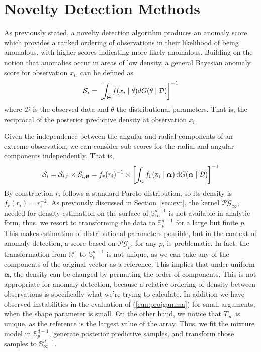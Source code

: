 \section{Novelty Detection Methods\label{sec:novelty}}
As previously stated, a novelty detection algorithm produces an anomaly score 
    which provides a ranked ordering of observations in their likelihood of being
    anomalous, with higher scores indicating more likely anomalous. Building on 
    the notion that anomalies occur in areas of low density, a general Bayesian
    anomaly score for observation $x_i$, can be defined as
    \[
    \mathcal{S}_i = \left[\int_{\Theta}f(x_i\mid\theta)dG(\theta\mid\mathcal{D})\right]^{-1}
    \]
    where $\mathcal{D}$ is the observed data and $\theta$ the distributional
    parameters.  That is, the reciprocal of the posterior predictive density 
    at observation $x_i$.

Given the independence between the angular and radial components of an
    extreme observation, we can consider sub-scores for the radial 
    and angular components independently.  That is,
    \[
        \mathcal{S}_i = \mathcal{S}_{i,r}\times \mathcal{S}_{i,\bm{v}} = 
            f_r(r_i)^{-1}\times
            \left[\int_{\Omega} f_v(\bm{v}_i\mid\bm{\alpha})
                \,\text{d}G(\bm{\alpha}\mid\mathcal{D})\right]^{-1}
    \]
    By construction $r_i$ follows a standard Pareto distribution, so its
    density is $f_r(r_i) = r_i^{-2}$.  As previously discussed in
    Section~\ref{sec:evt}, the kernel $\mathcal{PG}_\infty$, needed for 
    density estimation on the surface of ${\mathbb S}_{\infty}^{d-1}$ is 
    not available in analytic form, thus, we resort to transforming the
    data to $\mathbb{S}_p^{d-1}$ for a large but finite $p$.
    This makes estimation of distributional parameters possible, 
    but in the context of anomaly detection, a score based on
    $\mathcal{PG}_p$, for any $p$, is problematic.  In fact, the 
    transformation from ${\mathbb R}_+^p$ to $\mathbb{S}_p^{d-1}$ is not
    unique, as we can take any of the components of the original vector
    as a reference.  This implies that
    under uniform $\bm{\alpha}$, the density can be changed by
    permuting the order of components.  This is not appropriate for anomaly
    detection, because a relative ordering of density between 
    observations is specifically what we're trying to calculate. In addition
    we have observed instabilities in the evaluation of (\ref{eqn:projgamma}) 
    for small arguments, when the shape parameter is small. On the other hand,
    we notice that $T_\infty$ is unique, as the reference is the largest value
    of the array. Thus, we fit the mixture model in $\mathbb{S}_p^{d-1}$, generate
    posterior predictive samples, and transform those samples to 
    $\mathbb{S}_\infty^{d-1}$.


